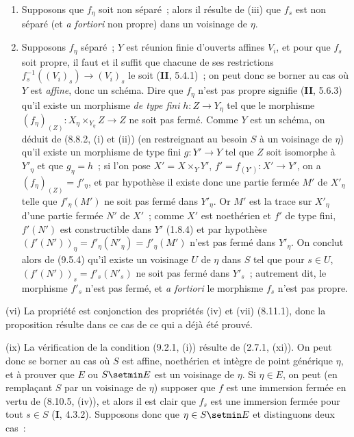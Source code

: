 \begin{enumerate}[label=\upshape{$\arabic{enumi}^\circ$}]
  \item Supposons que $f_\eta$ soit non séparé~; alors il résulte de (iii) que
  $f_s$ est non séparé (et \emph{a fortiori} non propre) dans un voisinage de
  $\eta$.

  \item Supposons $f_\eta$ séparé~; $Y$ est réunion finie d'ouverts affines
  $V_i$, et pour que $f_s$ soit propre, il faut et il suffit que chacune de ses
  restrictions $f_s^{-1}((V_i)_s)\to(V_i)_s$ le soit (\textbf{II}, 5.4.1)~;
  on peut donc se borner au cas où $Y$ est \emph{affine}, donc un schéma. Dire
  que $f_\eta$ n'est pas propre signifie (\textbf{II}, 5.6.3) qu'il existe un
  morphisme \emph{de type fini} $h:Z\to Y_\eta$ tel que le morphisme
  $(f_\eta)_{(Z)}:X_\eta\times_{Y_\eta}Z\to Z$ ne soit pas fermé. Comme $Y$ est
  un schéma, on déduit de (8.8.2, (i) et (ii)) (en restreignant au besoin $S$ à
  un voisinage de $\eta$) qu'il existe un morphisme de type fini $g:Y'\to Y$
  tel que $Z$ soit isomorphe à $Y'_\eta$ et que $g_\eta=h$~; si l'on pose
  $X'=X\times_YY'$, $f'=f_{(Y')}:X'\to Y'$, on a
  $(f_\eta)_{(Z)}=f'_\eta$, et par hypothèse il existe donc une partie fermée
  $M'$ de $X'_\eta$ telle que $f'_\eta(M')$ ne soit pas fermé dans $Y'_\eta$.
  Or $M'$ est la trace sur $X'_\eta$ d'une partie fermée $N'$ de $X'$~; comme
  $X'$ est noethérien et $f'$ de type fini, $f'(N')$ est constructible dans
  $Y'$ (1.8.4) et par hypothèse
  $(f'(N'))_\eta=f'_\eta(N'_\eta)=f'_\eta(M')$ n'est pas fermé dans
  $Y'_\eta$. On conclut alors de (9.5.4) qu'il existe un voisinage $U$ de
  $\eta$ dans $S$ tel que pour $s\in U$,
  $(f'(N'))_s=f'_s(N'_s)$ ne soit pas fermé dans $Y'_s$~; autrement dit, le
  morphisme $f'_s$ n'est pas fermé, et \emph{a fortiori} le morphisme $f_s$
  n'est pas propre.
\end{enumerate}

(vi) La propriété est conjonction des propriétés (iv) et (vii) (8.11.1), donc
la proposition résulte dans ce cas de ce qui a déjà été prouvé.

(ix) La vérification de la condition (9.2.1, (i)) résulte de (2.7.1, (xi)). On
peut donc se borner au cas où $S$ est affine, noethérien et intègre de point
générique $\eta$, et à prouver que $E$ ou $S\setmin E$ est un voisinage de $\eta$. Si
$\eta\in E$, on peut (en remplaçant $S$ par un voisinage de $\eta$) supposer
que $f$ est une immersion fermée en vertu de (8.10.5, (iv)), et alors il est
clair que $f_s$ est une immersion fermée pour tout $s\in S$ (\textbf{I},
4.3.2). Supposons donc que $\eta\in S\setmin E$ et distinguons deux cas~:

